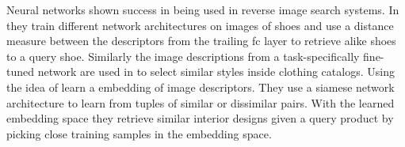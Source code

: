 Neural networks shown success in being used in reverse image search systems. In \citep{khosla_building_2015} they train different network architectures on images of shoes and use a distance measure between the descriptors from the trailing \gls{fc} layer to retrieve alike shoes to a query shoe. Similarly the image descriptions from a task-specifically fine-tuned network are used in \citep{chen_visual-based_2015} to select similar styles inside clothing catalogs. Using the idea of \citep{wang_learning_2014} \citet{bell_learning_2015} learn a embedding of image descriptors. They use a siamese network architecture to learn from tuples of similar or dissimilar pairs. With the learned embedding space they retrieve similar interior designs given a query product by picking close training samples in the embedding space.
